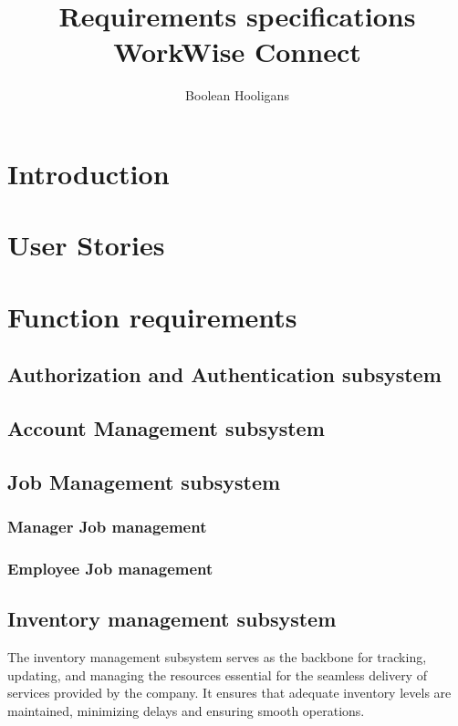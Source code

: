\documentclass{article}
\title{%
	Requirements specifications \\
	\large WorkWise Connect}
\author{Boolean Hooligans}
\begin{document}
	
	\maketitle
	\newpage
	
	\section*{Introduction}	
	
	\newpage
	
	\section*{User Stories}
	
	\newpage
	
	\section*{Function requirements}
	\subsection*{Authorization and Authentication subsystem}	
	\subsection*{Account Management subsystem}	
	\subsection*{Job Management subsystem}	

	\subsubsection*{Manager Job management}	
	\subsubsection*{Employee Job management}	
	\subsection*{Inventory management subsystem}
	The inventory management subsystem serves as the backbone for tracking, updating, and managing the resources essential for the seamless delivery of services provided by the company. It ensures that adequate inventory levels are maintained, minimizing delays and ensuring smooth operations.
\end{document}

